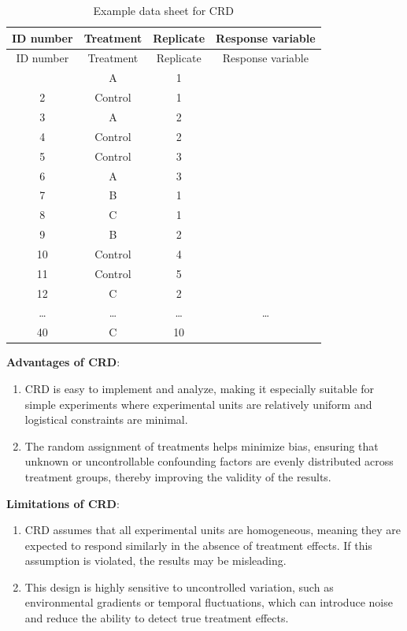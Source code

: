 \documentclass[
]{book}
\providecommand{\tightlist}{%
  \setlength{\itemsep}{0pt}\setlength{\parskip}{0pt}}
\begin{document}
\begin{longtable}[]{@{}cccc@{}}
\caption{\label{tab:crd} Example data sheet for CRD}\tabularnewline
\toprule\noalign{}
ID number & Treatment & Replicate & Response variable \\
\midrule\noalign{}
\endfirsthead
\toprule\noalign{}
ID number & Treatment & Replicate & Response variable \\
\midrule\noalign{}
\endhead
\bottomrule\noalign{}
\endlastfoot
1 & A & 1 & \\
2 & Control & 1 & \\
3 & A & 2 & \\
4 & Control & 2 & \\
5 & Control & 3 & \\
6 & A & 3 & \\
7 & B & 1 & \\
8 & C & 1 & \\
9 & B & 2 & \\
10 & Control & 4 & \\
11 & Control & 5 & \\
12 & C & 2 & \\
\ldots{} & \ldots{} & \ldots{} & \ldots{} \\
40 & C & 10 & \\
\end{longtable}

\textbf{Advantages of CRD}:

\begin{enumerate}
\def\labelenumi{\arabic{enumi}.}
\tightlist
\item
  CRD is easy to implement and analyze, making it especially suitable for simple experiments where experimental units are relatively uniform and logistical constraints are minimal.
\item
  The random assignment of treatments helps minimize bias, ensuring that unknown or uncontrollable confounding factors are evenly distributed across treatment groups, thereby improving the validity of the results.
\end{enumerate}

\textbf{Limitations of CRD}:

\begin{enumerate}
\def\labelenumi{\arabic{enumi}.}
\tightlist
\item
  CRD assumes that all experimental units are homogeneous, meaning they are expected to respond similarly in the absence of treatment effects. If this assumption is violated, the results may be misleading.
\item
  This design is highly sensitive to uncontrolled variation, such as environmental gradients or temporal fluctuations, which can introduce noise and reduce the ability to detect true treatment effects.
\end{enumerate}
\end{document}
